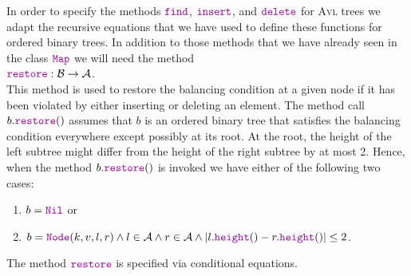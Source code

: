 In order to specify the methods \emph{$\mytt{find}$}, \emph{$\mytt{insert}$}, and \emph{$\mytt{delete}$} for \textsc{Avl} trees we
adapt the recursive equations that we have used to define these functions for ordered binary trees.
In addition to those methods that we have already seen in the class $\mytt{Map}$ we will need the method
\\[0.2cm]
\hspace*{1.3cm} $\mytt{restore}: \Bin \rightarrow \AVL$. 
\\[0.2cm]
This method is used to restore the balancing condition at a given node if it has been violated by
either inserting or deleting an element.
The method call $b.\mytt{restore}()$ assumes that  $b$ is an ordered binary tree that satisfies
the balancing condition everywhere except possibly at its root. 
At the root, the height of the left subtree might differ from the height of the right subtree by at
most 2.  Hence, when the method $b.\mytt{restore}()$ is invoked we have either of the following
two cases:
\begin{enumerate}
\item $b = \mytt{Nil}$ \quad or
\item $b = \mytt{Node}(k,v,l,r) \wedge l \in \AVL \wedge r \in \AVL \wedge
       |l.\mytt{height}() - r.\mytt{height}()| \leq 2$.
\end{enumerate}
The method $\mytt{restore}$ is specified via conditional equations.
